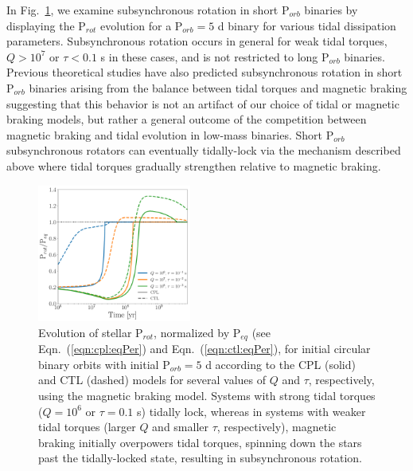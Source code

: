 \documentclass[twocolumn]{aastex61}
\begin{document}
In Fig.~\ref{fig:eqPerShortPorb}, we examine subsynchronous rotation in short P$_{orb}$ binaries by displaying the P$_{rot}$ evolution for a P$_{orb} = 5$ d binary for various tidal dissipation parameters. Subsynchronous rotation occurs in general for weak tidal torques, $Q>10^7$ or $\tau < 0.1$ s in these cases, and is not restricted to long P$_{orb}$ binaries. Previous theoretical studies have also predicted subsynchronous rotation in short P$_{orb}$ binaries arising from the balance between tidal torques and magnetic braking \citep[e.g.][]{Habets1989,Zahn1994,Keppens1997} suggesting that this behavior is not an artifact of our choice of tidal or magnetic braking models, but rather a general outcome of the competition between magnetic braking and tidal evolution in low-mass binaries.  Short P$_{orb}$ subsynchronous rotators can eventually tidally-lock via the mechanism described above where tidal torques gradually strengthen relative to magnetic braking. 

\begin{figure}
	\includegraphics[width=0.45\textwidth]{../Plots/eqPerShortPorbMatt.pdf}
   \caption{Evolution of stellar P$_{rot}$, normalized by P$_{eq}$ (see Eqn.~(\ref{eqn:cpl:eqPer}) and Eqn.~(\ref{eqn:ctl:eqPer}), for initial circular binary orbits with initial P$_{orb} = 5$ d according to the CPL (solid) and CTL (dashed) models for several values of $Q$ and $\tau$, respectively, using the \citet{Matt2015} magnetic braking model. Systems with strong tidal torques ($Q = 10^6$ or $\tau = 0.1$ s) tidally lock, whereas in systems with weaker tidal torques (larger $Q$ and smaller $\tau$, respectively), magnetic braking initially overpowers tidal torques, spinning down the stars past the tidally-locked state, resulting in subsynchronous rotation. }%
    \label{fig:eqPerShortPorb}%
\end{figure}

\end{document}
